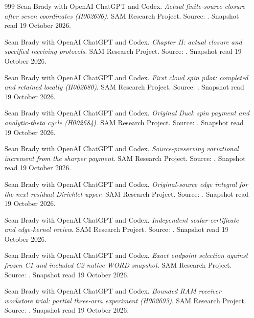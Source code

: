 \begin{thebibliography}{999}
 Sean Brady with OpenAI ChatGPT and Codex. \emph{Actual finite-source closure after seven coordinates (H002636)}. SAM Research Project. Source: . Snapshot read 19 October 2026.

 Sean Brady with OpenAI ChatGPT and Codex. \emph{Chapter II: actual closure and specified receiving protocols}. SAM Research Project. Source: . Snapshot read 19 October 2026.

 Sean Brady with OpenAI ChatGPT and Codex. \emph{First cloud spin pilot: completed and retained locally (H002680)}. SAM Research Project. Source: . Snapshot read 19 October 2026.

 Sean Brady with OpenAI ChatGPT and Codex. \emph{Original Duck spin payment and analytic-theta cycle (H002684)}. SAM Research Project. Source: . Snapshot read 19 October 2026.

 Sean Brady with OpenAI ChatGPT and Codex. \emph{Source-preserving variational increment from the sharper payment}. SAM Research Project. Source: . Snapshot read 19 October 2026.

 Sean Brady with OpenAI ChatGPT and Codex. \emph{Original-source edge integral for the next residual Dirichlet upper}. SAM Research Project. Source: . Snapshot read 19 October 2026.

 Sean Brady with OpenAI ChatGPT and Codex. \emph{Independent scalar-certificate and edge-kernel review}. SAM Research Project. Source: . Snapshot read 19 October 2026.

 Sean Brady with OpenAI ChatGPT and Codex. \emph{Exact endpoint selection against frozen C1 and included C2 native WORD snapshot}. SAM Research Project. Source: . Snapshot read 19 October 2026.

 Sean Brady with OpenAI ChatGPT and Codex. \emph{Bounded RAM receiver workstore trial: partial three-arm experiment (H002693)}. SAM Research Project. Source: . Snapshot read 19 October 2026.


\end{thebibliography}
